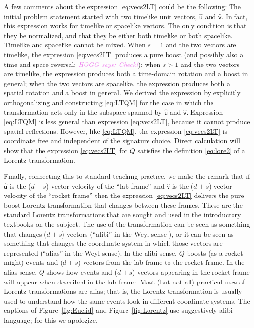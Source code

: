 \documentclass{article}
\newcommand{\Lhat}[1]{\hat{\mathsf{#1}}} %
\newcommand{\plus}{\!+\!} %
\newcommand{\figref}[1]{Figure~\ref{#1}}
\newcommand{\HOGG}[1]{\textcolor{violet}{\textsl{HOGG says: {#1}}}}
\begin{document}
A few comments about the expression \eqref{eq:vecs2LT} could be the following:
The initial problem statement started with two timelike unit vectors, $\Lhat{u}$ and $\Lhat{v}$.
In fact, this expression works for timelike or spacelike vectors.
The only condition is that they be normalized, and that they be either both timelike or both spacelike.
Timelike and spacelike cannot be mixed.
When $s=1$ and the two vectors are timelike, the expression \eqref{eq:vecs2LT} produces a pure boost (and possibly also a time 
and space reversal; \HOGG{Check!});
when $s>1$ and the two vectors are timelike, the expression produces both a time-domain rotation and a boost in general;
when the two vectors are spacelike, the expression produces both a spatial rotation and a boost in general.
We derived the expression by explicitly orthogonalizing and constructing \eqref{eq:LTQM} for the case in which the transformation acts only in the subspace spanned by $\Lhat{u}$ and $\Lhat{v}$.
Expression \eqref{eq:LTQM} is less general than expression \eqref{eq:vecs2LT}, because it cannot produce spatial reflections.
However, like \eqref{eq:LTQM}, the expression \eqref{eq:vecs2LT} is coordinate free and independent of the signature choice.
Direct calculation will show that the expression \eqref{eq:vecs2LT} for $Q$ satisfies the definition \eqref{eq:lore2} of a Lorentz transformation.

Finally, connecting this to standard teaching practice, we make the remark that if $\Lhat{u}$ is the ($d\plus s$)-vector velocity of the ``lab frame'' and $\Lhat{v}$ is the ($d\plus s$)-vector velocity of the ``rocket frame'' then the expression \eqref{eq:vecs2LT} delivers the pure boost Lorentz transformation that changes between these frames.
These are the standard Lorentz transformations that are sought and used in the introductory textbooks on the subject.
The use of the transformation can be seen as something that changes ($d\plus s$) vectors (``alibi'' in the Weyl sense \cite{weyl}),
or it can be seen as something that changes the coordinate system in which those vectors are represented (``alias'' in the Weyl sense).
In the alibi sense, $Q$ boosts (as a rocket might) events and ($d\plus s$)-vectors from the lab frame to the rocket frame.
In the alias sense, $Q$ shows how events and ($d\plus s$)-vectors appearing in the rocket frame will appear when described in the lab frame.
Most (but not all) practical uses of Lorentz transformations are alias;
that is, the Lorentz transformation is usually used to understand how the same events look in different coordinate systems.
The captions of \figref{fig:Euclid} and \figref{fig:Lorentz} use suggestively alibi language; for this we apologize.
\end{document}
